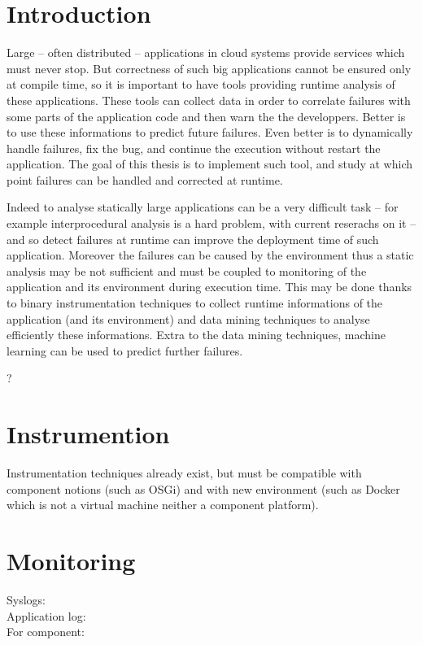 \section{Introduction}

Large -- often distributed -- applications in cloud systems provide services which must never stop. But correctness of such big applications cannot be ensured only at compile time, so it is important to have tools providing runtime analysis of these applications. These tools can collect data in order to correlate failures with some parts of the application code and then warn the the developpers. Better is to use these informations to predict future failures. Even better is to dynamically handle failures, fix the bug, and continue the execution without restart the application. The goal of this thesis is to implement such tool, and study at which point failures can be handled and corrected at runtime.

Indeed to analyse statically large applications can be a very difficult task -- for example interprocedural analysis is a hard problem, with current reserachs on it \cite{Art21} -- and so detect failures at runtime can improve the deployment time of such application. Moreover the failures can be caused by the environment thus a static analysis may be not sufficient and must be coupled to monitoring of the application and its environment during execution time. This may be done thanks to binary instrumentation techniques to collect runtime informations of the application (and its environment) and data mining techniques to analyse efficiently these informations. Extra to the data mining techniques, machine learning can be used to predict further failures. 

\cite{Art4, Art7} ?

\section{Instrumention}

Instrumentation techniques \cite{Art5, Art10, Art16} already exist, but must be compatible with component notions (such as \textsf{OSGi}) and with new environment (such as \textsf{Docker} which is not a virtual machine neither a component platform).

\section{Monitoring}

Syslogs: \cite{Art2}\\
Application log: \cite{Art15}\\
For component: \cite{Art20}

